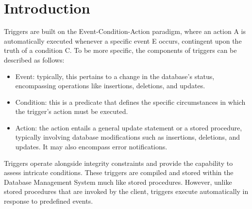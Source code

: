 \section{Introduction}

Triggers are built on the Event-Condition-Action paradigm, where an action A is automatically executed whenever a specific event E occurs, contingent upon the truth of a condition C.
To be more specific, the components of triggers can be described as follows:
\begin{itemize}
    \item Event: typically, this pertains to a change in the database's status, encompassing operations like insertions, deletions, and updates.
    \item Condition: this is a predicate that defines the specific circumstances in which the trigger's action must be executed.
    \item Action: the action entails a general update statement or a stored procedure, typically involving database modifications such as insertions, deletions, and updates. 
        It may also encompass error notifications.
\end{itemize}

Triggers operate alongside integrity constraints and provide the capability to assess intricate conditions. 
These triggers are compiled and stored within the Database Management System  much like stored procedures. 
However, unlike stored procedures that are invoked by the client, triggers execute automatically in response to predefined events.